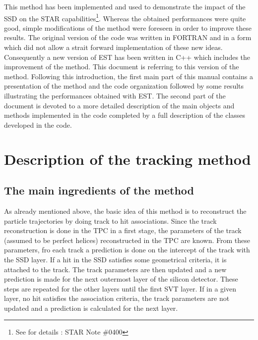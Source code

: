 \documentclass[twoside]{article}
\begin{document}
This method has been implemented and used to demonstrate the impact of
the SSD on the STAR capabilities\footnote{See for details : STAR Note
\#0400}. Whereas the obtained performances were quite good, simple 
modifications of the method were foreseen in order to improve these
results. The original version of the code was written in FORTRAN and
in a form which did not allow a strait forward implementation of these
new ideas. Consequently a new version of EST has been written in C++
which includes the improvement of the method. This document is
referring to this version of the method. Following this introduction,
the first main part of this manual contains a presentation of the
method and the code organization followed by some results illustrating
the performances obtained with EST. The second part of the document is
devoted to a more detailed description of the main objects and
methods implemented in the code completed by a full description of the
classes developed in the code.



\section{Description of the tracking method}
\label{sec:Principles}

\subsection{The main ingredients of the method}

As already mentioned above, the basic idea of this method is to
reconstruct the particle trajectories by doing track to hit
associations. Since the track reconstruction is done in the TPC in a
first stage, the parameters of the track (assumed to be perfect
helices) reconstructed in the TPC are known. From these parameters,
fro each track a prediction is done on the intercept of the track with
the SSD layer. If a hit in the SSD satisfies some geometrical
criteria, it is attached to the track. The track parameters are then
updated and a new prediction is made for the next outermost layer of
the silicon detector. These steps are repeated for the other layers
until the first SVT layer. If in a given layer, no hit satisfies the
association criteria, the track parameters are not updated and a
prediction is calculated for the next layer. 
\end{document}
